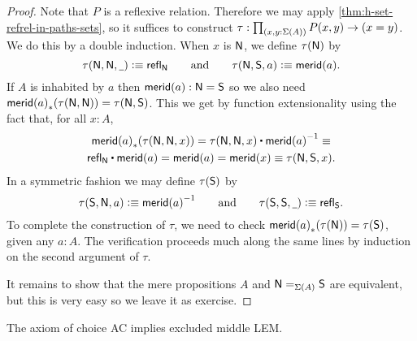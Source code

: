 \begin{proof}
Note that $P$ is a reflexive relation.
Therefore we may apply \autoref{thm:h-set-refrel-in-paths-sets}, so it suffices to
construct $\tau : \prd{x,y:\susp(A)}P(x,y)\to(x=y)$. We do this by a double induction.
When $x$ is $\north$, we define $\tau(\north)$ by
%
\begin{equation*}
  \tau(\north,\north, \blank) \defeq \refl{\north}
  \qquad\text{and}\qquad
  \tau(\north,\south,a) \defeq \merid(a).
\end{equation*}
%
If $A$ is inhabited by $a$ then $\merid(a) : \north = \south$ so we also need $\trans{\merid(a)}{\tau(\north, \north)} =
\tau(\north, \south)$. This we get by function extensionality using the fact that, for all $x : A$,
%
\begin{multline*}
  \trans{\merid(a)}{\tau(\north,\north,x)} =
  \tau(\north,\north,x) \ct \opp{\merid(a)} \jdeq \\
  \refl{\north} \ct \merid(a) =
  \merid(a) =
  \merid(x) \jdeq
  \tau(\north, \south, x).
\end{multline*}
In a symmetric fashion we may define $\tau(\south)$ by
%
\begin{equation*}
  \tau(\south,\north, a) \defeq \opp{\merid(a)}
  \qquad\text{and}\qquad
  \tau(\south,\south, \blank) \defeq \refl{\south}.
\end{equation*}
%
To complete the construction of $\tau$, we need to check $\trans{\merid(a)}{\tau(\north)} = \tau(\south)$,
given any $a : A$. The verification proceeds much along the same lines by induction on the
second argument of $\tau$.

It remains to show that the mere propositions $A$ and $\id[\susp(A)]{\north}{\south}$ are
equivalent, but this is very easy so we leave it as exercise.
\end{proof}

\begin{thm}[Diaconescu]\label{thm:1surj_to_surj_to_pem}
  The axiom of choice AC implies excluded middle LEM.
\end{thm}

